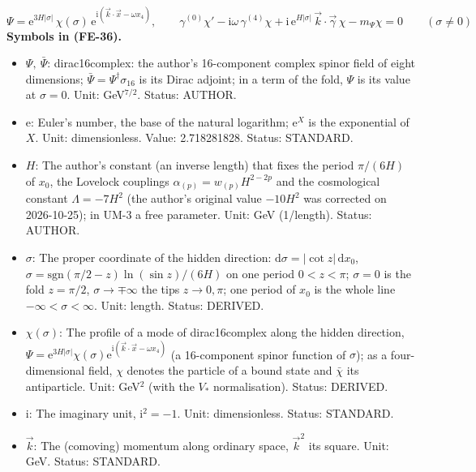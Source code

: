 \documentclass[
  10pt,
]{article}
\providecommand{\tightlist}{%
  \setlength{\itemsep}{0pt}\setlength{\parskip}{0pt}}
\begin{document}
\[
\Psi = \mathrm{e}^{3H\lvert\sigma\rvert}\,\chi(\sigma)\,\mathrm{e}^{\mathrm{i}(\vec k\cdot\vec x - \omega x_4)},\qquad
\gamma^{(0)}\chi' - \mathrm{i}\omega\,\gamma^{(4)}\chi + \mathrm{i}\,\mathrm{e}^{H\lvert\sigma\rvert}\,\vec k\cdot\vec\gamma\,\chi
 - m_\Psi\chi = 0\qquad(\sigma \ne 0) \tag{FE-36}
\] \textbf{Symbols in (FE-36).}

\begin{itemize}
\tightlist
\item
  \(\Psi,\ \bar\Psi\): dirac16complex: the author's 16-component complex
  spinor field of eight dimensions;
  \(\bar\Psi = \Psi^\dagger\sigma_{16}\) is its Dirac adjoint; in a term
  of the fold, \(\Psi\) is its value at \(\sigma = 0\). Unit:
  GeV\(^{7/2}\). Status: AUTHOR.
\item
  \(\mathrm{e}\): Euler's number, the base of the natural logarithm;
  \(\mathrm{e}^{X}\) is the exponential of \(X\). Unit: dimensionless.
  Value: 2.718281828. Status: STANDARD.
\item
  \(H\): The author's constant (an inverse length) that fixes the period
  \(\pi/(6H)\) of \(x_0\), the Lovelock couplings
  \(\alpha_{(p)} = w_{(p)}H^{2-2p}\) and the cosmological constant
  \(\Lambda = -7H^2\) (the author's original value \(-10H^2\) was
  corrected on 2026-10-25); in UM-3 a free parameter. Unit: GeV
  (1/length). Status: AUTHOR.
\item
  \(\sigma\): The proper coordinate of the hidden direction:
  \(\mathrm{d}\sigma = \lvert\cot z\rvert\,\mathrm{d}x_0\),
  \(\sigma = \mathrm{sgn}(\pi/2 - z)\ln(\sin z)/(6H)\) on one period
  \(0 < z < \pi\); \(\sigma = 0\) is the fold \(z = \pi/2\),
  \(\sigma \to \mp\infty\) the tips \(z \to 0, \pi\); one period of
  \(x_0\) is the whole line \(-\infty < \sigma < \infty\). Unit: length.
  Status: DERIVED.
\item
  \(\chi(\sigma)\): The profile of a mode of dirac16complex along the
  hidden direction,
  \(\Psi = \mathrm{e}^{3H\lvert\sigma\rvert}\chi(\sigma)\mathrm{e}^{\mathrm{i}(\vec k\cdot\vec x - \omega x_4)}\)
  (a 16-component spinor function of \(\sigma\)); as a four-dimensional
  field, \(\chi\) denotes the particle of a bound state and \(\bar\chi\)
  its antiparticle. Unit: GeV\(^{2}\) (with the \(V_*\) normalisation).
  Status: DERIVED.
\item
  \(\mathrm{i}\): The imaginary unit, \(\mathrm{i}^2 = -1\). Unit:
  dimensionless. Status: STANDARD.
\item
  \(\vec k\): The (comoving) momentum along ordinary space, \(\vec k^2\)
  its square. Unit: GeV. Status: STANDARD.

\end{itemize}
\end{document}
